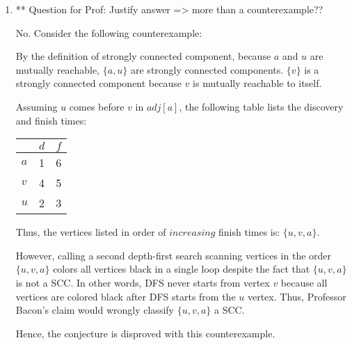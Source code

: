 \documentclass[a4paper]{report}
\begin{document}
\begin{enumerate}
    \item
      ** Question for Prof: Justify answer => more than a counterexample??

      No. Consider the following counterexample:


      By the definition of strongly connected component, because $a$ and $u$ are mutually reachable,
      $\{a,u\}$ are strongly connected components. $\{v\}$ is a strongly connected component because $v$
      is mutually reachable to itself. 

      Assuming $u$ comes before $v$ in $adj[a]$, the following table lists the discovery and finish times:

      \begin{center}
        \begin{tabular}{ l | c | r }
          \hline
            & $d$ & $f$ \\ \hline
          $a$ & 1 & 6 \\
          $v$ & 4 & 5 \\
          $u$ & 2 & 3 \\
          \hline  
        \end{tabular}
      \end{center}

      Thus, the vertices listed in order of $increasing$ finish times is: $\{u, v, a\}$.

      However, calling a second depth-first search scanning vertices in the order $\{u, v, a\}$ colors
      all vertices black in a single loop despite the fact that $\{u, v, a\}$ is not a SCC. 
      In other words, DFS never starts from vertex $v$ because all vertices are colored black after DFS starts from the $u$ vertex. 
      Thus, Professor Bacon's claim would wrongly classify $\{u, v, a\}$ a SCC.

      Hence, the conjecture is disproved with this counterexample.


\end{enumerate}
\end{document}
